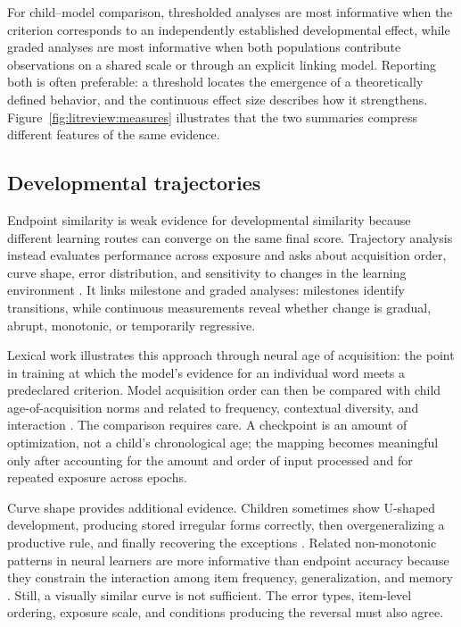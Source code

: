 For child--model comparison, thresholded analyses are most informative when the criterion corresponds to an independently established developmental effect, while graded analyses are most informative when both populations contribute observations on a shared scale or through an explicit linking model. Reporting both is often preferable: a threshold locates the emergence of a theoretically defined behavior, and the continuous effect size describes how it strengthens. Figure~\ref{fig:litreview:measures} illustrates that the two summaries compress different features of the same evidence.

\subsection{Developmental trajectories}
\label{sec:litreview:trajectories}

Endpoint similarity is weak evidence for developmental similarity because different learning routes can converge on the same final score. Trajectory analysis instead evaluates performance across exposure and asks about acquisition order, curve shape, error distribution, and sensitivity to changes in the learning environment \citep{Chang2022,Evanson2023,Ma2024}. It links milestone and graded analyses: milestones identify transitions, while continuous measurements reveal whether change is gradual, abrupt, monotonic, or temporarily regressive.

Lexical work illustrates this approach through neural age of acquisition: the point in training at which the model's evidence for an individual word meets a predeclared criterion. Model acquisition order can then be compared with child age-of-acquisition norms and related to frequency, contextual diversity, and interaction \citep{Chang2022,Ma2024}. The comparison requires care. A checkpoint is an amount of optimization, not a child's chronological age; the mapping becomes meaningful only after accounting for the amount and order of input processed and for repeated exposure across epochs.

Curve shape provides additional evidence. Children sometimes show U-shaped development, producing stored irregular forms correctly, then overgeneralizing a productive rule, and finally recovering the exceptions \citep{Marcus1992}. Related non-monotonic patterns in neural learners are more informative than endpoint accuracy because they constrain the interaction among item frequency, generalization, and memory \citep{michaly2025development}. Still, a visually similar curve is not sufficient. The error types, item-level ordering, exposure scale, and conditions producing the reversal must also agree.

